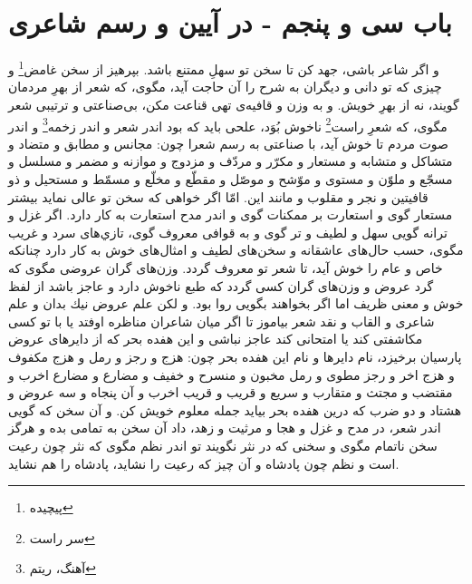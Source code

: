 \section*{باب سى و پنجم - 
در آيين و رسم شاعرى}

و اگر شاعر باشى، جهد كن تا سخن تو سهلِ ممتنع باشد. بپرهيز از سخن غامض\footnote{پیچیده} و چيزى كه تو دانى و ديگران به شرح را آن حاجت آيد، مگوى، كه شعر از بهرِ مردمان گويند، نه از بهرِ خويش. و به وزن و قافيه‌ی تهى قناعت مكن، بى‌صناعتى و ترتيبى شعر مگوى، كه شعرِ راست\footnote{سر راست} ناخوش بُوَد، علحى بايد كه بود اندر شعر و اندر زخمه\footnote{آهنگ، ریتم} و اندر صوت مردم تا خوش آيد، با صناعتى به رسم شعرا چون: مجانس و مطابق و متضاد و متشاكل و متشابه و مستعار و مكرّر و مردّف و مزدوج و موازنه و مضمر و مسلسل و مسجّع و ملوّن و مستوى و موّشح و موصّل و مقطّع و مخلّع و مسمّط و مستحيل و ذو قافيتين و نجر و مقلوب و مانند اين. امّا اگر خواهى كه سخن تو عالى نمايد بيشتر مستعار گوى و استعارت بر ممكنات گوى و اندر مدح استعارت به كار دارد. اگر غزل و ترانه گويى سهل و لطيف و تر گوى و به قوافى معروف گوى، تازي‌هاى سرد و غريب مگوى، حسب حال‌هاى عاشقانه و سخن‌هاى لطيف و امثال‌هاى خوش به كار دارد چنانكه خاص و عام را خوش آيد، تا شعر تو معروف گردد. وزن‌هاى گران عروضى مگوى كه گرد عروض و وزن‌هاى گران كسى گردد كه طبع ناخوش دارد و عاجز باشد از لفظ خوش و معنى ظريف اما اگر بخواهند بگويى روا بود. و لكن علم عروض نيك بدان و علم شاعرى و القاب و نقد شعر بياموز تا اگر ميان شاعران مناظره اوفتد يا با تو كسى مكاشفتى كند يا امتحانى كند عاجز نباشى و اين هفده بحر كه از دايرهاى عروض پارسيان برخيزد، نام دايرها و نام اين هفده بحر چون: هزج و رجز و رمل و هزج مكفوف و هزج اخر و رجز مطوى و رمل مخبون و منسرح و خفيف و مضارع و مضارع اخرب و مقتضب و مجتث و متقارب و سريع و قريب و قريب اخرب و آن پنجاه و سه عروض و هشتاد و دو ضرب كه درين هفده بحر بيايد جمله معلوم خويش كن. و آن سخن كه گويى اندر شعر، در مدح و غزل و هجا و مرثيت و زهد، داد آن سخن به تمامى بده و هرگز سخن ناتمام مگوى و سخنى كه در نثر نگويند تو اندر نظم مگوى كه نثر چون رعيت است و نظم چون پادشاه و آن چيز كه رعيت را نشايد، پادشاه را هم نشايد.

